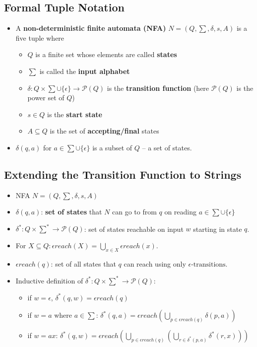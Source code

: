 \subsection{Formal Tuple Notation}
\begin{itemize}
    \item A \textbf{non-deterministic finite automata (NFA)} $N = (Q, \sum, \delta, s, A)$ is a five tuple where
    \begin{itemize}
        \item $Q$ is a finite set whose elements are called \textbf{states}
        \item $\sum$ is called the \textbf{input alphabet}
        \item $\delta: Q \times \sum \cup \{ \epsilon \} \rightarrow \mathcal{P}(Q)$ is the \textbf{transition function} (here $\mathcal{P}(Q)$ is the power set of $Q$)
        \item $s \in Q$ is the \textbf{start state}
        \item $A \subseteq Q$ is the set of \textbf{accepting/final} states
    \end{itemize}
    \item $\delta(q, a)$ for $a \in \sum \cup \{ \epsilon \}$ is a subset of $Q$ -- a set of states.
\end{itemize}

\subsection{Extending the Transition Function to Strings}
\begin{itemize}
    \item NFA $N = (Q, \sum, \delta, s, A)$
    \item $\delta(q, a)$: \textbf{set of states} that $N$ can go to from $q$ on reading $a \in \sum \cup \{ \epsilon \}$
    \item $\delta^{\ast}: Q \times \sum^{\ast} \rightarrow \mathcal{P}(Q)$: set of states reachable on input $w$ starting in state $q$.
    \item For $X \subseteq Q: \epsilon reach(X) = \bigcup_{x \in X}\epsilon reach(x)$.
    \item $\epsilon reach(q)$: set of all states that $q$ can reach using only $\epsilon \text{-transitions}$.
    \item Inductive definition of $\delta^{\ast} : Q \times \sum^{\ast} \rightarrow \mathcal{P}(Q)$:
    \begin{itemize}
        \item if $w = \epsilon$, $\delta^{\ast}(q, w) = \epsilon reach(q)$
        \item if $w = a$ where $a \in \sum$: $\delta^{\ast}(q, a) = \epsilon reach(\underset{p \in \epsilon reach(q)}{\bigcup} \delta(p, a))$
        \item if $w = ax$: $\delta^{\ast}(q, w) = \epsilon reach ( \underset{p \in \epsilon reach(q)}{\bigcup}(\underset{r \in \delta^{\ast} (p, a)}{\bigcup} \delta^{\ast}(r, x)))$
    \end{itemize}
\end{itemize}

